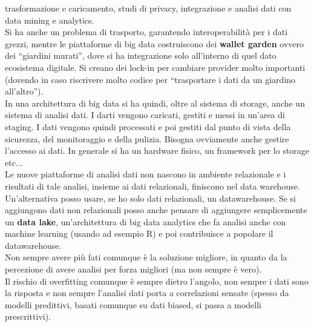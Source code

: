 \documentclass[a4paper,12pt, oneside]{book}
\begin{document}
trasformazione e caricamento, studi di privacy, integrazione e analisi dati con
data mining e analytics. \\
Si ha anche un problema di trasporto, garantendo interoperabilità per i dati
grezzi, mentre le piattaforme di big data costruiscono dei \textbf{wallet
  garden} ovvero dei ``giardini murati'', dove si ha integrazione solo
all'interno di quel dato ecosistema digitale. Si creano dei lock-in per cambiare
provider molto importanti (dovendo in caso riscrivere molto codice per
``trasportare i dati da un giardino all'altro'').\\
In una architettura di big data si ha quindi, oltre al sistema di storage, anche
un sistema di analisi dati. I darti vengono caricati, gestiti e messi in un'area
di staging. I dati vengono quindi processati e poi gestiti dal punto di vista
della sicurezza, del monitoraggio e della pulizia. Bisogna ovviamente anche
gestire l'accesso ai dati.
In generale si ha un hardware fisico, un framework per lo storage etc$\ldots$\\
Le nuove piattaforme di analisi dati non nascono in ambiente relazionale e i
risultati di tale analisi, insieme ai dati relazionali, finiscono nel data
warehouse. Un'alternativa posso usare, se ho solo dati relazionali, un
datawarehouse. Se si aggiungono dati non relazionali posso anche pensare di
aggiungere semplicemente un \textbf{data lake}, un'architettura di big data
analytics che fa analisi anche con machine learning (usando ad esempio R) e poi
contribuisce a popolare il datawarehouse.\\
Non sempre avere più fati comunque è la soluzione migliore, in quanto da la
percezione di avere analisi per forza migliori (ma non sempre è vero).\\
Il rischio di overfitting comunque è sempre dietro l'angolo, non sempre i dati
sono la risposta e non sempre l'analisi dati porta a correlazioni sensate
(spesso da modelli predittivi, basati comunque su dati biased, si passa a
modelli prescrittivi).
\end{document}
